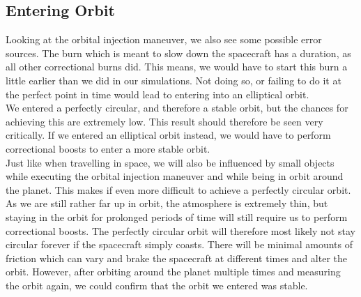 \documentclass[reprint,english,notitlepage]{revtex4-2}
\begin{document}
\subsection{Entering Orbit}\label{subsec:entering-orbit}
    Looking at the orbital injection maneuver, we also see some possible error sources.
    The burn which is meant to slow down the spacecraft has a duration, as all other correctional burns did.
    This means, we would have to start this burn a little earlier than we did in our simulations.
    Not doing so, or failing to do it at the perfect point in time would lead to entering into an elliptical orbit.\\
    We entered a perfectly circular, and therefore a stable orbit, but the chances for achieving this are extremely low.
    This result should therefore be seen very critically.
    If we entered an elliptical orbit instead, we would have to perform correctional boosts to enter a more stable orbit.\\
    Just like when travelling in space, we will also be influenced by small objects while executing the orbital injection maneuver and while being in orbit around the planet.
    This makes if even more difficult to achieve a perfectly circular orbit.\\

    As we are still rather far up in orbit, the atmosphere is extremely thin, but staying in the orbit for prolonged periods of time will still require us to perform correctional boosts.
    The perfectly circular orbit will therefore most likely not stay circular forever if the spacecraft simply coasts.
    There will be minimal amounts of friction which can vary and brake the spacecraft at different times and alter the orbit.
    However, after orbiting around the planet multiple times and measuring the orbit again, we could confirm that the orbit we entered was stable.
\end{document}
